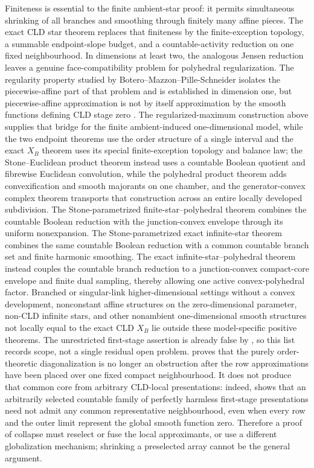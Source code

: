 \begin{remark}
Finiteness is essential to the finite ambient-star proof: it permits
simultaneous shrinking of all branches and smoothing through finitely many
affine pieces.  The exact CLD star theorem replaces that finiteness by the
finite-exception topology, a summable endpoint-slope budget, and a
countable-activity reduction on one fixed neighbourhood.  In dimensions at
least two, the analogous Jensen reduction leaves a genuine face-compatibility
problem for polyhedral regularization.  The
regularity property studied by Botero--Mazzon--Pille-Schneider isolates the
piecewise-affine part of that problem and is established in dimension one,
but piecewise-affine approximation is not by itself approximation by the
smooth functions defining CLD stage zero
\cite[Theorem~6.4, Remark~6.6 and Proposition~6.13]{BMPS26}.  The
regularized-maximum construction above supplies that bridge for the finite
ambient-induced one-dimensional model, while the two endpoint theorems use
the order structure of a single interval and the exact $X_B$ theorem uses
its special finite-exception topology and balance law; the Stone--Euclidean
product theorem instead uses a countable Boolean quotient and fibrewise
Euclidean convolution, while the polyhedral product theorem adds
convexification and smooth majorants on one chamber, and the
generator-convex complex theorem transports that construction across an
entire locally developed subdivision.  The Stone-parametrized
finite-star--polyhedral theorem combines the countable Boolean reduction
with the junction-convex envelope through its uniform nonexpansion.  The
Stone-parametrized exact infinite-star theorem combines the same countable
Boolean reduction with a common countable branch set and finite harmonic
smoothing.  The exact infinite-star--polyhedral theorem instead couples the
countable branch reduction to a junction-convex compact-core envelope and
finite dual sampling, thereby allowing one active convex-polyhedral factor.
Branched or singular-link higher-dimensional settings without a convex
development, nonconstant affine structures on the zero-dimensional
parameter, non-CLD infinite stars, and other nonambient
one-dimensional smooth structures not locally equal to the exact CLD
$X_B$ lie outside these model-specific positive theorems.  The unrestricted
first-stage assertion is already false by
, so this list records scope, not
a single residual open problem.
 proves that the purely order-theoretic
diagonalization is no longer an obstruction after the row approximations
have been placed over one fixed compact neighbourhood.  It does not produce
that common core from arbitrary CLD-local presentations: indeed,
 shows that an arbitrarily
selected countable family of perfectly harmless first-stage presentations
need not admit any common representative neighbourhood, even when every row
and the outer limit represent the global smooth function zero.  Therefore a
proof of collapse must reselect or fuse the local approximants, or use a
different globalization mechanism; shrinking a preselected array cannot be
the general argument.
\end{remark}

